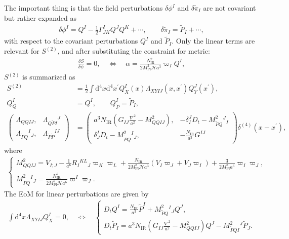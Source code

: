 \documentclass[aps, prd
, preprint
, nofootinbib 
, longbibliography
]{revtex4-1}
\newcommand{\dd}{\mathrm{d}}
\newcommand{\Mpl}{M_\mathrm{Pl}}
\newcommand{\IR}{\mathrm{IR}}
\newcommand{\dps}{\displaystyle}
\newcommand{\calH}{\mathcal{H}}
\newcommand{\bae}[1]{\begin{align} #1 \end{align}}
\newcommand{\bce}[1]{\begin{cases} #1 \end{cases}}
\newcommand{\bpme}[1]{\begin{pmatrix} #1 \end{pmatrix}}
\begin{document}
The important thing is that the field perturbations $\delta\phi^I$ and $\delta\tilde{\pi}_I$ are not covariant but rather expanded as~\cite{Gong:2011uw}
\bae{
    \delta\phi^I=Q^I-\frac{1}{2}\Gamma^I_{JK}Q^JQ^K+\cdots, \qquad \delta\tilde{\pi}_I=\tilde{P}_I+\cdots,
}
with respect to the covariant perturbations $Q^I$ and $\tilde{P}_I$.
Only the linear terms are relevant for $S^{(2)}$, and after substituting the constraint for metric:
\bae{
    \frac{\delta S}{\delta\psi}=0, \quad \Leftrightarrow \quad \alpha=\frac{N_\IR^2}{2\Mpl^2\calH a^3}\varpi_IQ^I,
}
$S^{(2)}$ is summarized as
\bae{
    S^{(2)}&=\frac{1}{2}\int\dd^4x\dd^4x^\prime Q_X^I(x)\Lambda_{XYIJ}(x,x^\prime)Q^J_Y(x^\prime), \\
    Q^I_Q&=Q^I, \qquad Q^I_{\tilde{P}}=\tilde{P}_I, \\
    \bpme{
        \Lambda_{QQIJ}, & \Lambda_{Q\tilde{P}I}{}^J \\
        \Lambda_{\tilde{P}Q}{}^I{}_J, & \Lambda_{\tilde{P}\tilde{P}}{}^{IJ}
    }&=\bpme{
        a^3N_\IR\left(G_{IJ}\frac{\nabla^2}{a^2}-M^2_{QQIJ}\right), & -\delta^J_ID_t-M^2_{\tilde{P}Q}{}^J{}_I \\
        \delta^I_JD_t-M^2_{\tilde{P}Q}{}^I{}_J, & -\frac{N_\IR}{a^3}G^{IJ}
    }\delta^{(4)}(x-x^\prime),
}
where
\bae{
    \bce{
        \dps
        M^2_{QQIJ}=V_{I;J}-\frac{1}{a^6}R_I{}^{KL}{}_J\varpi_K\varpi_L+\frac{N_\IR}{2\Mpl^2\calH a^3}(V_I\varpi_J+V_J\varpi_I)+\frac{3}{2\Mpl^2a^6}\varpi_I\varpi_J, \\
        \dps
        M^2_{\tilde{P}Q}{}^I{}_J=\frac{N_\IR^2}{2\Mpl^2\calH a^6}\varpi^I\varpi_J.
    }
}
The EoM for linear perturbations are given by
\bae{
    \int\dd^4x\Lambda_{XYIJ}Q^I_X=0, \quad \Leftrightarrow \quad \bce{
        \dps
        D_tQ^I=\frac{N_\IR}{a^3}\tilde{P}^I+M^2_{\tilde{P}Q}{}^I{}_JQ^J, \\
        \dps
        D_t\tilde{P}_I=a^3N_\IR\left(G_{IJ}\frac{\nabla^2}{a^2}-M^2_{QQIJ}\right)Q^J-M^2_{\tilde{P}{Q}I}{}^J\tilde{P}_J.
    }
}
\end{document}
